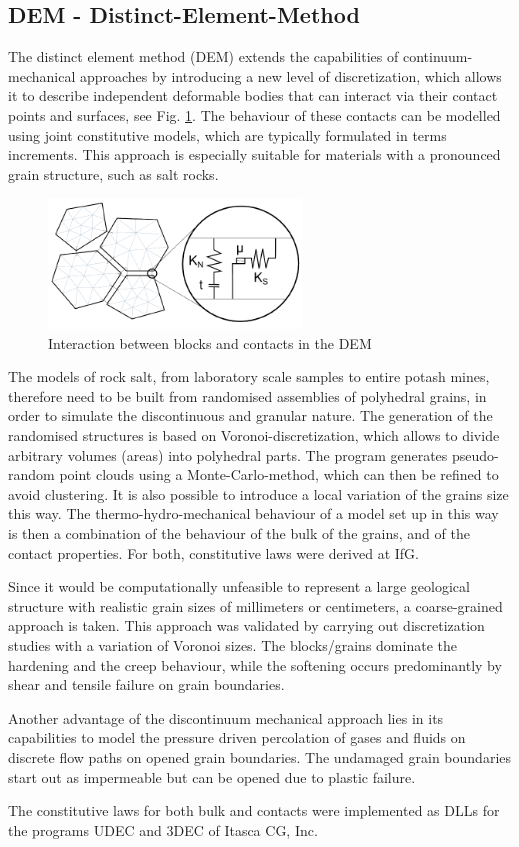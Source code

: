 \subsection{DEM - Distinct-Element-Method}

The distinct element method (DEM) extends the capabilities of continuum-mechanical approaches by introducing 
a new level of discretization, which allows it to describe independent deformable bodies that can interact 
via their contact points and surfaces, see Fig. \ref{fig:demskizze}. The behaviour of these contacts can be modelled using joint constitutive models, which are typically formulated in terms increments. This approach is especially suitable for materials with a pronounced grain structure, such as salt rocks. 

\begin{figure}[!ht]
\centering
\includegraphics[width=0.6\textwidth]{figures/skizze.png}
\caption{Interaction between blocks and contacts in the DEM}
\label{fig:demskizze}
\end{figure}

The models of rock salt, from laboratory scale samples to entire potash mines, therefore need to be built from 
randomised assemblies of polyhedral grains, in order to simulate the discontinuous and granular nature. The generation of the randomised structures is based on Voronoi-discretization, which allows to divide arbitrary volumes (areas) into polyhedral parts. The program generates pseudo-random point clouds using a Monte-Carlo-method, which can then be refined to avoid clustering. It is also possible to introduce a local variation of the grains size this way. 
The thermo-hydro-mechanical behaviour of a model set up in this way is then a combination of the behaviour of the 
bulk of the grains, and of the contact properties. For both, constitutive laws were derived at IfG. 

Since it would be computationally unfeasible to represent a large geological structure with realistic grain sizes 
of millimeters or centimeters, a coarse-grained approach is taken. This approach was validated by carrying out 
discretization studies with a variation of Voronoi sizes. The blocks/grains dominate the hardening and the creep 
behaviour, while the softening occurs predominantly by shear and tensile failure on grain boundaries. 

Another advantage of the discontinuum mechanical approach lies in its capabilities to model the pressure driven 
percolation of gases and fluids on discrete flow paths on opened grain boundaries. The undamaged grain boundaries 
start out as impermeable but can be opened due to plastic failure. 

The constitutive laws for both bulk and contacts were implemented as DLLs for the programs UDEC and 3DEC of Itasca CG, Inc.
